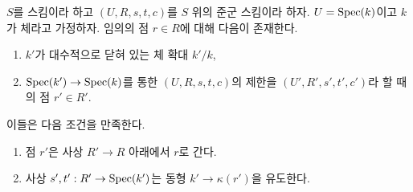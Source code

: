 \begin{lemma}
\label{lemma-groupoid-on-field-explain-points}
$S$를 스킴이라 하고 $(U, R, s, t, c)$를 $S$ 위의 준군 스킴이라 하자.
$U = \mathop{\mathrm{Spec}}(k)$이고 $k$가 체라고 가정하자. 임의의 점 $r \in R$에 대해
다음이 존재한다.
\begin{enumerate}
\item $k'$가 대수적으로 닫혀 있는 체 확대 $k'/k$,
\item $\mathop{\mathrm{Spec}}(k') \to \mathop{\mathrm{Spec}}(k)$를 통한 $(U, R, s, t, c)$의 제한을
$(U', R', s', t', c')$라 할 때의 점 $r' \in R'$.
\end{enumerate}
이들은 다음 조건을 만족한다.
\begin{enumerate}
\item 점 $r'$은 사상 $R' \to R$ 아래에서 $r$로 간다.
\item 사상 $s', t' : R' \to \mathop{\mathrm{Spec}}(k')$는 동형
$k' \to \kappa(r')$을 유도한다.
\end{enumerate}
\end{lemma}

